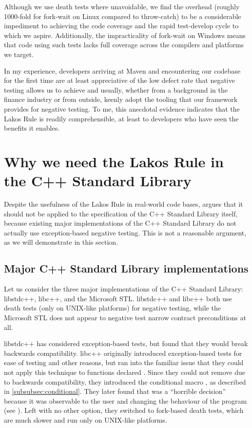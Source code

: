 Although we use death tests where unavoidable, we find the overhead (roughly 1000-fold for fork-wait on Linux compared to throw-catch) to be a considerable impediment to achieving the code coverage and the rapid test-develop cycle to which we aspire. Additionally, the impracticality of fork-wait on Windows means that code using such tests lacks full coverage across the compilers and platforms we target.

In my experience, developers arriving at Maven and encountering our codebase for the first time are at least appreciative of the low defect rate that negative testing allows us to achieve and usually, whether from a background in the finance industry or from outside, keenly adopt the tooling that our framework provides for negative testing. To me, this anecdotal evidence indicates that the Lakos Rule is readily comprehensible, at least to developers who have seen the benefits it enables.

\section{Why we need the Lakos Rule in the C++ Standard Library}
\label{sec:stdlib}

Despite the usefulness of the Lakos Rule in real-world code bases, \cite{P1656R2} argues that it should not be applied to the specification of the C++ Standard Library itself, because existing major implementations of the C++ Standard Library do not actually use exception-based negative testing. This is not a reasonable argument, as we will demonstrate in this section.

\subsection{Major C++ Standard Library implementations}
\label{subsec:major}

Let us consider the three major implementations of the C++ Standard Library: libstdc++, libc++, and the Microsoft STL. libstdc++ and libc++ both use death tests (only on UNIX-like platforms) for negative testing, while the Microsoft STL does not appear to negative test narrow contract preconditions at all.

libstdc++ has considered exception-based tests, but found that they would break backwards compatibility. libc++ originally introduced exception-based tests for ease of testing and other reasons, but ran into the familiar issue that they could not apply this technique to functions declared . Since they could not remove  due to backwards compatibility, they introduced the conditional  macro  , as described in \ref{subsubsec:conditional}. They later found that  was a ``horrible decision'' because  it was observable to the user and changing the behaviour of the program (see \cite{LLVMReviewD59166}). Left with no other option, they switched to fork-based death tests, which are much slower and run only on UNIX-like platforms.

